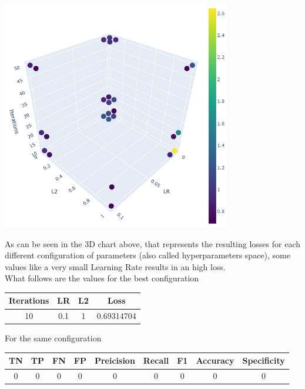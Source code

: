 \documentclass[
	letterpaper, %
	10pt, %
]{class}
\begin{document}
\begin{center}
    \includegraphics[width=10cm]{../images/3d.png}
\end{center}

As can be seen in the 3D chart above, that represents the resulting losses for each different configuration of parameters (also called hyperparameters space), some values like a very small Learning Rate results in an high loss.\\
What follows are the values for the best configuration

\begin{center}
    \begin{tabular}{ |c|c|c|c| }
        \hline
        Iterations & LR  & L2 & Loss       \\
        \hline
        10         & 0.1 & 1  & 0.69314704 \\
        \hline
    \end{tabular}
\end{center}

For the same configuration

\begin{center}
    \begin{tabular}{ |c|c|c|c|c|c|c|c|c| }
        \hline
        TN & TP & FN & FP & Preicision & Recall & F1 & Accuracy & Specificity \\
        \hline
        0  & 0  & 0  & 0  & 0          & 0      & 0  & 0        & 0           \\
        \hline
    \end{tabular}
\end{center}
\end{document}

